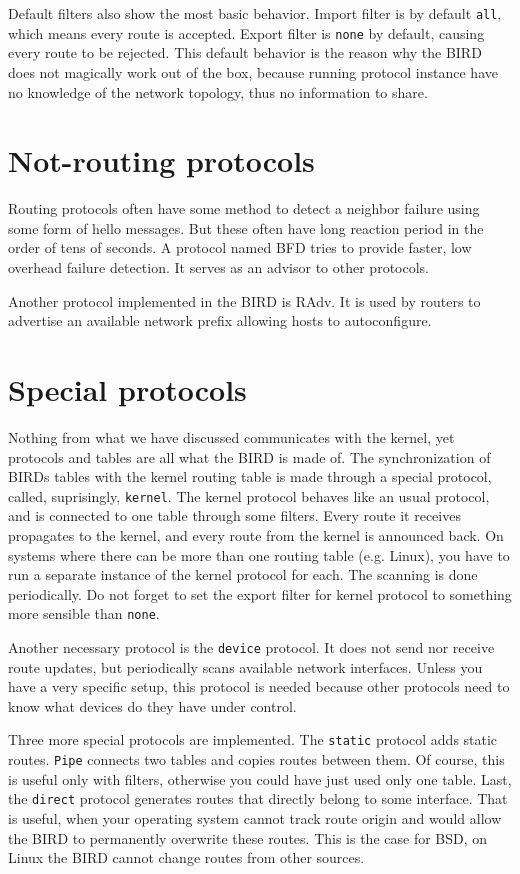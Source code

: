 Default filters also show the most basic behavior. Import filter is by default
\texttt{all}, which means every route is accepted. Export filter is
\texttt{none} by default, causing every route to be rejected. This default
behavior is the reason why the BIRD does not magically work out of the box,
because running protocol instance have no knowledge of the network topology,
thus no information to share.

\section{Not-routing protocols}
Routing protocols often have some method to detect a neighbor failure using
some form of hello messages. But these often have long reaction period in the
order of tens of seconds. A protocol named BFD tries to provide faster, low
overhead failure detection. It serves as an advisor to other protocols.

Another protocol implemented in the BIRD is RAdv. It is used by routers to
advertise an available network prefix allowing hosts to autoconfigure.

\section{Special protocols}
Nothing from what we have discussed communicates with the kernel, yet protocols
and tables are all what the BIRD is made of. The synchronization of BIRDs
tables with the kernel routing table is made through a special protocol,
called, suprisingly, \texttt{kernel}. The kernel protocol behaves like an usual
protocol, and is connected to one table through some filters. Every route it
receives propagates to the kernel, and every route from the kernel is announced
back. On systems where there can be more than one routing table (e.g. Linux),
you have to run a separate instance of the kernel protocol for each. The
scanning is done periodically. Do not forget to set the export filter for
kernel protocol to something more sensible than \texttt{none}.

Another necessary protocol is the \texttt{device} protocol. It does not send
nor receive route updates, but periodically scans available network interfaces.
Unless you have a very specific setup, this protocol is needed because other
protocols need to know what devices do they have under control.

Three more special protocols are implemented. The \texttt{static} protocol adds
static routes. \texttt{Pipe} connects two tables and copies routes between
them. Of course, this is useful only with filters, otherwise you could have
just used only one table. Last, the \texttt{direct} protocol generates routes
that directly belong to some interface. That is useful, when your operating
system cannot track route origin and would allow the BIRD to permanently
overwrite these routes. This is the case for BSD, on Linux the BIRD cannot
change routes from other sources.

